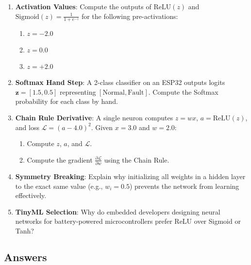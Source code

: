 \begin{enumerate}
    \item \textbf{Activation Values}: Compute the outputs of $\text{ReLU}(z)$ and $\text{Sigmoid}(z) = \frac{1}{1 + e^{-z}}$ for the following pre-activations:
    \begin{enumerate}
        \item $z = -2.0$
        \item $z = 0.0$
        \item $z = +2.0$
    \end{enumerate}

    \item \textbf{Softmax Hand Step}: A 2-class classifier on an ESP32 outputs logits $\mathbf{z} = [1.5, 0.5]$ representing $[\text{Normal}, \text{Fault}]$. Compute the Softmax probability for each class by hand.

    \item \textbf{Chain Rule Derivative}: A single neuron computes $z = w x$, $a = \text{ReLU}(z)$, and loss $\mathcal{L} = (a - 4.0)^2$. Given $x = 3.0$ and $w = 2.0$:
    \begin{enumerate}
        \item Compute $z$, $a$, and $\mathcal{L}$.
        \item Compute the gradient $\frac{\partial \mathcal{L}}{\partial w}$ using the Chain Rule.
    \end{enumerate}

    \item \textbf{Symmetry Breaking}: Explain why initializing all weights in a hidden layer to the exact same value (e.g., $w_i = 0.5$) prevents the network from learning effectively.

    \item \textbf{TinyML Selection}: Why do embedded developers designing neural networks for battery-powered microcontrollers prefer ReLU over Sigmoid or Tanh?
\end{enumerate}

\subsection*{Answers}

